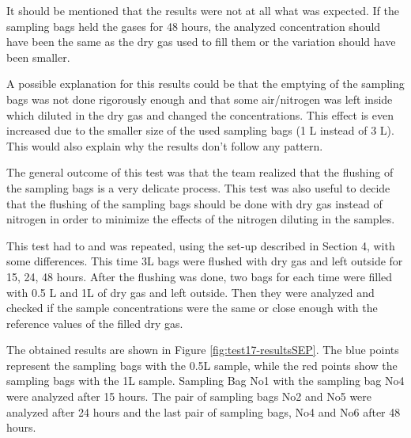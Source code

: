 \documentclass[a4paper,12pt,oneside]{article}
\begin{document}
\begin{appendices}
It should be mentioned that the results were not at all what was expected. If the sampling bags held the gases for 48 hours, the analyzed concentration should have been the same as the dry gas used to fill them or the variation should have been smaller. 

A possible explanation for this results could be that the emptying of the sampling bags was not done rigorously enough and that some air/nitrogen was left inside which diluted in the dry gas and changed the concentrations. This effect is even increased due to the smaller size of the used sampling bags (1 L instead of 3 L). This would also explain why the results don't follow any pattern. 

The general outcome of this test was that the team realized that the flushing of the sampling bags is a very delicate process. This test was also useful to decide that the flushing of the sampling bags should be done with dry gas instead of nitrogen in order to minimize the effects of the nitrogen diluting in the samples. 

This test had to and was repeated, using the set-up described in Section 4, with some differences. This time 3L bags were flushed with dry gas and left outside for 15, 24, 48 hours. After the flushing was done, two bags for each time were filled with 0.5 L and 1L of dry gas and left outside. Then they were analyzed and checked if the sample concentrations were the same or close enough with the reference values of the filled dry gas.

The obtained results are shown in Figure \ref{fig:test17-resultsSEP}. The blue points represent the sampling bags with the 0.5L sample, while the red points show the sampling bags with the 1L sample. Sampling Bag No1 with the sampling bag No4 were analyzed after 15 hours. The pair of sampling bags No2 and No5 were analyzed after 24 hours and the last pair of sampling bags, No4 and No6 after 48 hours.  


\end{appendices}
\end{document}
